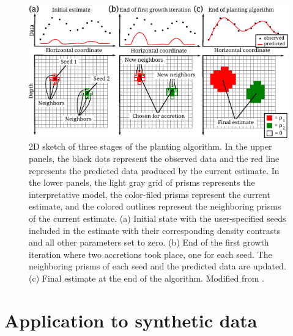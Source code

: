 \documentclass{segabs}
\begin{document}
\begin{figure}[htb]
    \includegraphics[width=\columnwidth]{sketch/algorithm}
    \caption{
        2D sketch of three stages of the planting algorithm.
        In the upper panels, the black dots represent the observed data and
        the red line represents the predicted data produced by the current
        estimate.
        In the lower panels, the light gray grid of prisms represents the
        interpretative model, the color-filed prisms represent the current
        estimate, and the colored outlines represent the neighboring prisms of
        the current estimate.
        (a) Initial state with the user-specified seeds included in the estimate
        with their corresponding density contrasts and all other parameters set
        to zero.
        (b) End of the first growth iteration where two accretions took place,
        one for each seed.
        The neighboring prisms of each seed and the predicted data are updated.
        (c) Final estimate at the end of the algorithm.
        Modified from \citet{Uieda2011}.
    \label{fig:sketch}}
\end{figure}

\section{Application to synthetic data}
\end{document}
